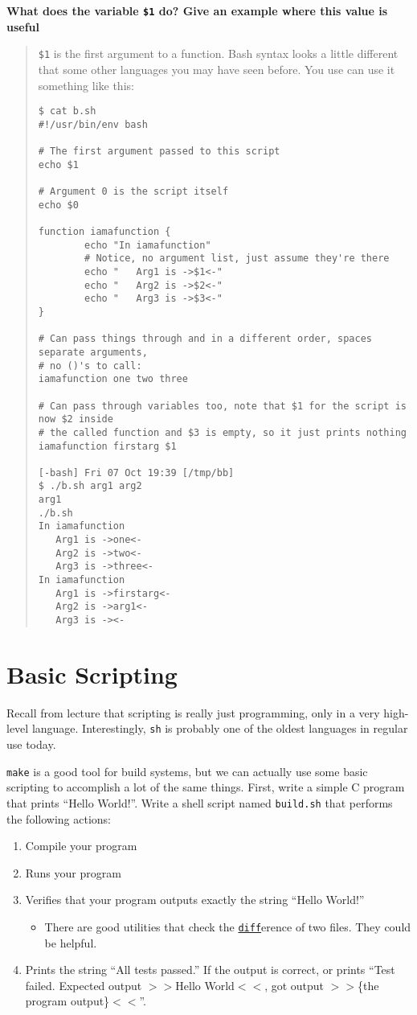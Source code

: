 \documentclass{article}
\begin{document}
\textbf{What does the variable \texttt{\$1} do? Give an example where this
value is useful}
\begin{quote}
  \color{violet}
  \texttt{\$1} is the first argument to a function. Bash syntax looks a little
  different that some other languages you may have seen before. You use can
  use it something like this:

  \begin{lstlisting}
$ cat b.sh
#!/usr/bin/env bash

# The first argument passed to this script
echo $1

# Argument 0 is the script itself
echo $0

function iamafunction {
       	echo "In iamafunction"
       	# Notice, no argument list, just assume they're there
       	echo "   Arg1 is ->$1<-"
       	echo "   Arg2 is ->$2<-"
       	echo "   Arg3 is ->$3<-"
}

# Can pass things through and in a different order, spaces separate arguments,
# no ()'s to call:
iamafunction one two three

# Can pass through variables too, note that $1 for the script is now $2 inside
# the called function and $3 is empty, so it just prints nothing
iamafunction firstarg $1

[-bash] Fri 07 Oct 19:39 [/tmp/bb]
$ ./b.sh arg1 arg2
arg1
./b.sh
In iamafunction
   Arg1 is ->one<-
   Arg2 is ->two<-
   Arg3 is ->three<-
In iamafunction
   Arg1 is ->firstarg<-
   Arg2 is ->arg1<-
   Arg3 is -><-
  \end{lstlisting}
\end{quote}

\newpage
\section{Basic Scripting}

Recall from lecture that scripting is really just programming, only in a very
high-level language. Interestingly, \texttt{sh} is probably one of the oldest
languages in regular use today.

\texttt{make} is a good tool for build systems, but we can actually use some
basic scripting to accomplish a lot of the same things.
First, write a simple C program that prints ``Hello World!''.
Write a shell script named \texttt{build.sh} that performs the following
actions:
\begin{enumerate}
  \item Compile your program
  \item Runs your program
  \item Verifies that your program outputs exactly the string ``Hello World!''
    \begin{itemize}
      \item There are good utilities that check the \texttt{\ul{diff}}erence of two
        files. They could be helpful.
    \end{itemize}
  \item Prints the string ``All tests passed.'' If the output is correct, or
    prints ``Test failed. Expected output $>>$Hello World$<<$, got
    output $>>$\{the program output\}$<<$''.
\end{enumerate}
\end{document}
